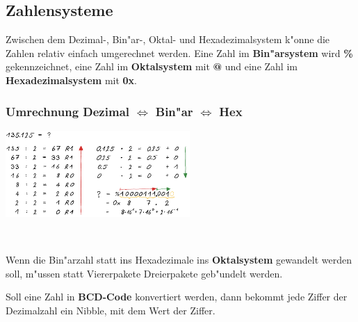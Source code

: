 \subsection{Zahlensysteme}
Zwischen dem Dezimal-, Bin"ar-, Oktal- und Hexadezimalsystem k"onne die Zahlen relativ einfach umgerechnet werden. Eine Zahl im \textbf{Bin"arsystem} wird \textbf{\%} gekennzeichnet, eine Zahl im \textbf{Oktalsystem} mit \textbf{@} und eine Zahl im \textbf{Hexadezimalsystem} mit \textbf{0x}.


\subsubsection{Umrechnung Dezimal $\Leftrightarrow$ Bin"ar $\Leftrightarrow$ Hex}
\begin{minipage}{7cm}
	\includegraphics[width=7cm]{pics/Zahlenumrechnung}
\end{minipage}
%
\begin{minipage}{0.5cm}
	\ \
\end{minipage}
%
\begin{minipage}{11cm}
	Wenn die Bin"arzahl statt ins Hexadezimale ins \textbf{Oktalsystem} gewandelt werden soll, m"ussen statt Viererpakete Dreierpakete geb"undelt werden. 
	
	Soll eine Zahl in \textbf{BCD-Code} konvertiert werden, dann bekommt jede Ziffer der Dezimalzahl ein Nibble, mit dem Wert der Ziffer.
\end{minipage}


